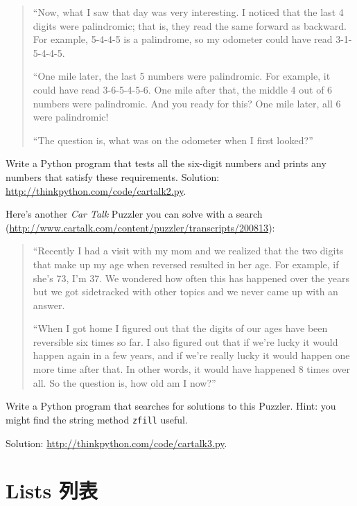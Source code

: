 \documentclass[10pt]{book}
\begin{document}
\begin{CJK}{UTF8}{gbsn}
\begin{exercise}
\begin{quote}
``Now, what I saw that day was very interesting. I noticed that the
last 4 digits were palindromic; that is, they read the same forward as
backward. For example, 5-4-4-5 is a palindrome, so my odometer
could have read 3-1-5-4-4-5.

``One mile later, the last 5 numbers were palindromic. For example, it
could have read 3-6-5-4-5-6.  One mile after that, the middle 4 out of
6 numbers were palindromic.  And you ready for this? One mile later,
all 6 were palindromic!

``The question is, what was on the odometer when I first looked?''
\end{quote}

Write a Python program that tests all the six-digit numbers and prints
any numbers that satisfy these requirements.  
Solution: \url{http://thinkpython.com/code/cartalk2.py}.

\end{exercise}


\begin{exercise}
Here's another {\em Car Talk} Puzzler you can solve with a
search (\url{http://www.cartalk.com/content/puzzler/transcripts/200813}):

\begin{quote}
``Recently I had a visit with my mom and we realized that
the two digits that make up my age when reversed resulted in her
age. For example, if she's 73, I'm 37. We wondered how often this has
happened over the years but we got sidetracked with other topics and
we never came up with an answer.

``When I got home I figured out that the digits of our ages have been
reversible six times so far. I also figured out that if we're lucky it
would happen again in a few years, and if we're really lucky it would
happen one more time after that. In other words, it would have
happened 8 times over all. So the question is, how old am I now?''

\end{quote}

Write a Python program that searches for solutions to this Puzzler.
Hint: you might find the string method {\tt zfill} useful.

Solution: \url{http://thinkpython.com/code/cartalk3.py}.

\end{exercise}



\chapter{Lists 列表}


\end{CJK}
\end{document}
